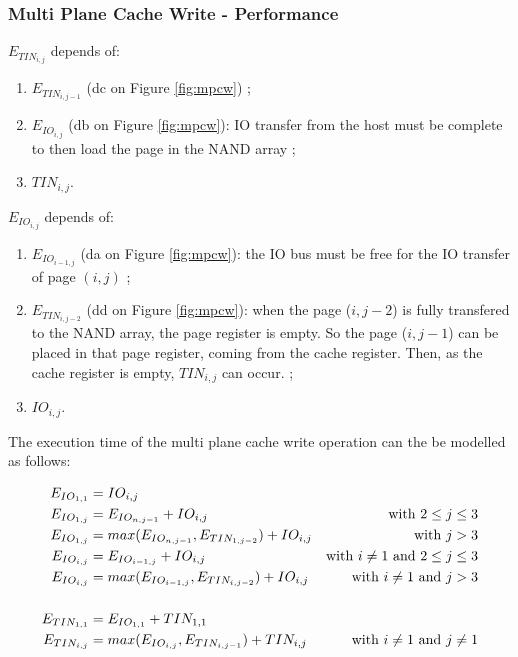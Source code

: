 \documentclass[oneside]{memoir}
\begin{document}
\subsubsection{Multi Plane Cache Write - Performance}

$E_{TIN_{i,j}}$ depends of:
\begin{enumerate}
  \item $E_{TIN_{i,j-1}}$ (dc on Figure \ref{fig:mpcw}) ;
  \item $E_{IO_{i,j}}$ (db on Figure \ref{fig:mpcw}): IO transfer from the host must be complete to then load the page in the NAND array ; 
  \item $TIN_{i,j}$.
\end{enumerate}

$E_{IO_{i,j}}$ depends of:
\begin{enumerate}
  \item $E_{IO_{i-1,j}}$ (da on Figure \ref{fig:mpcw}): the IO bus must be free for the IO transfer of page $(i, j)$ ;
  \item $E_{TIN_{i,j-2}}$ (dd on Figure \ref{fig:mpcw}): when the page ($i,j-2$) is fully transfered to the NAND array, the page register is empty. So the page ($i, j-1$) can be placed in that page register, coming from the cache register. Then, as the cache register is empty, $TIN_{i,j}$ can occur. ;
  \item $IO_{i,j}$.
\end{enumerate}

The execution time of the multi plane cache write operation can the be modelled as follows:

\begin{align}
E_{IO_{1,1}} &= IO_{i,j}
\notag\\E_{IO_{1,j}} &= E_{IO_{n,j-1}} + IO_{i,j} &\text{with } 2 \le j \le 3
\notag\\E_{IO_{1,j}} &= max(E_{IO_{n,j-1}}, E_{TIN_{1, j-2}}) + IO_{i,j} &\text{with } j > 3
\notag\\E_{IO_{i,j}} &= E_{IO_{i-1,j}} + IO_{i,j} &\text{with } i \ne 1 \text{ and } 2 \le j \le 3
\notag\\E_{IO_{i,j}} &= max(E_{IO_{i-1,j}}, E_{TIN_{i, j-2}}) + IO_{i,j} &\text{with } i \ne 1 \text{ and } j > 3
\\
\notag\\E_{TIN_{1,1}} &= E_{IO_{1,1}} + TIN_{1,1}
\notag\\E_{TIN_{i,j}} &= max(E_{IO_{i,j}}, E_{TIN_{i,j-1}}) + TIN_{i,j} &\text{with } i \ne 1 \text{ and } j \ne 1
\end{align}
\end{document}
